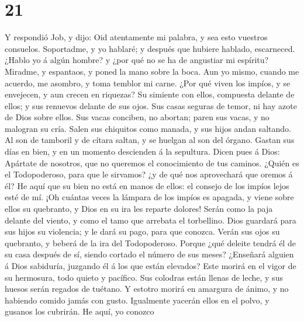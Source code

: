 \hypertarget{section-20}{%
\section{21}\label{section-20}}

 Y respondió Job, y dijo:  Oid atentamente
mi palabra, y sea esto vuestros consuelos.  Soportadme, y
yo hablaré; y después que hubiere hablado, escarneced. 
¿Hablo yo á algún hombre? y ¿por qué no se ha de angustiar mi espíritu?
 Miradme, y espantaos, y poned la mano sobre la boca.
 Aun yo mismo, cuando me acuerdo, me asombro, y toma
temblor mi carne.  ¿Por qué viven los impíos, y se
envejecen, y aun crecen en riquezas?  Su simiente con
ellos, compuesta delante de ellos; y sus renuevos delante de sus ojos.
 Sus casas seguras de temor, ni hay azote de Dios sobre
ellos.  Sus vacas conciben, no abortan; paren sus vacas,
y no malogran su cría.  Salen sus chiquitos como manada,
y sus hijos andan saltando.  Al son de tamboril y de
cítara saltan, y se huelgan al son del órgano.  Gastan
sus días en bien, y en un momento descienden á la sepultura.
 Dicen pues á Dios: Apártate de nosotros, que no queremos
el conocimiento de tus caminos.  ¿Quién es el
Todopoderoso, para que le sirvamos? ¿y de qué nos aprovechará que oremos
á él?  He aquí que su bien no está en manos de ellos: el
consejo de los impíos lejos esté de mí.  ¡Oh cuántas
veces la lámpara de los impíos es apagada, y viene sobre ellos su
quebranto, y Dios en su ira les reparte dolores!  Serán
como la paja delante del viento, y como el tamo que arrebata el
torbellino.  Dios guardará para sus hijos su violencia; y
le dará su pago, para que conozca.  Verán sus ojos su
quebranto, y beberá de la ira del Todopoderoso.  Porque
¿qué deleite tendrá él de su casa después de sí, siendo cortado el
número de sus meses?  ¿Enseñará alguien á Dios sabiduría,
juzgando él á los que están elevados?  Este morirá en el
vigor de su hermosura, todo quieto y pacífico.  Sus
colodras están llenas de leche, y sus huesos serán regados de tuétano.
 Y estotro morirá en amargura de ánimo, y no habiendo
comido jamás con gusto.  Igualmente yacerán ellos en el
polvo, y gusanos los cubrirán.  He aquí, yo conozco
